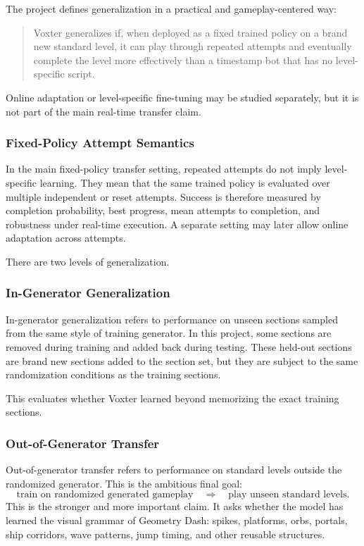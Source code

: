\documentclass[11pt]{article}
\begin{document}
The project defines generalization in a practical and gameplay-centered way:
\begin{quote}
Voxter generalizes if, when deployed as a fixed trained policy on a brand new standard level, it can play through repeated attempts and eventually complete the level more effectively than a timestamp bot that has no level-specific script.
\end{quote}

Online adaptation or level-specific fine-tuning may be studied separately, but it is not part of the main real-time transfer claim.

\subsubsection{Fixed-Policy Attempt Semantics}

In the main fixed-policy transfer setting, repeated attempts do not imply level-specific learning. They mean that the same trained policy is evaluated over multiple independent or reset attempts. Success is therefore measured by completion probability, best progress, mean attempts to completion, and robustness under real-time execution. A separate setting may later allow online adaptation across attempts.

There are two levels of generalization.

\subsubsection{In-Generator Generalization}

In-generator generalization refers to performance on unseen sections sampled from the same style of training generator. In this project, some sections are removed during training and added back during testing. These held-out sections are brand new sections added to the section set, but they are subject to the same randomization conditions as the training sections.

This evaluates whether Voxter learned beyond memorizing the exact training sections.

\subsubsection{Out-of-Generator Transfer}

Out-of-generator transfer refers to performance on standard levels outside the randomized generator. This is the ambitious final goal:
\[
  \text{train on randomized generated gameplay}
  \quad\Longrightarrow\quad
  \text{play unseen standard levels}.
\]
This is the stronger and more important claim. It asks whether the model has learned the visual grammar of Geometry Dash: spikes, platforms, orbs, portals, ship corridors, wave patterns, jump timing, and other reusable structures.
\end{document}
